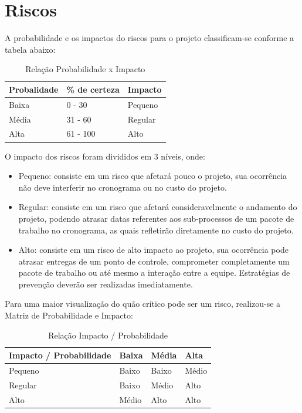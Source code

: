   \section{Riscos}

  A probabilidade e os impactos do riscos para o projeto classificam-se conforme a tabela abaixo:

  \begin{table}[]
    \centering
    \caption{Relação Probabilidade x Impacto}
    \label{probabilidadeximpacto}
    \begin{tabular}{|l|l|l|}
    \hline
    \textbf{Probalidade} & \textbf{\% de certeza} & \textbf{Impacto} \\ \hline
    Baixa                & 0 - 30                 & Pequeno          \\ \hline
    Média                & 31 - 60                & Regular          \\ \hline
    Alta                 & 61 - 100               & Alto             \\ \hline
    \end{tabular}
  \end{table}

  O impacto dos riscos foram divididos em 3 níveis, onde:

  \begin{itemize}
    \item Pequeno: consiste em um risco que afetará pouco o projeto, sua ocorrência não deve interferir no cronograma ou no
    custo do projeto.
    \item Regular: consiste em um risco que afetará consideravelmente o andamento do projeto, podendo atrasar datas referentes
    aos sub-processos de um pacote de trabalho no cronograma, as quais refletirão diretamente no custo do projeto.
    \item Alto: consiste em um risco de alto impacto ao projeto, sua ocorrência pode atrasar entregas de um ponto de controle,
    comprometer completamente um pacote de trabalho ou até mesmo a interação entre a equipe. Estratégias de prevenção deverão
    ser realizadas imediatamente.
  \end{itemize}

  Para uma maior visualização do quão crítico pode ser um risco, realizou-se a Matriz de Probabilidade e Impacto:

  \begin{table}[]
    \centering
    \caption{Relação Impacto / Probabilidade}
    \label{impactoporprobabilidade}
    \begin{tabular}{|l|l|l|l|}
    \hline
    \textbf{Impacto / Probabilidade} & \textbf{Baixa} & \textbf{Média} & \textbf{Alta} \\ \hline
    Pequeno                          & Baixo          & Baixo          & Médio         \\ \hline
    Regular                          & Baixo          & Médio          & Alto          \\ \hline
    Alto                             & Médio          & Alto           & Alto          \\ \hline
    \end{tabular}
  \end{table}


